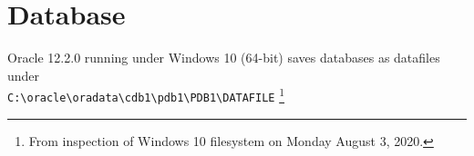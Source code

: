 
\newpage
\setcounter{secnumdepth}{0}
\section{Database}

Oracle 12.2.0 running under Windows 10 (64-bit) saves databases as
datafiles under\\
 \texttt{C:\textbackslash oracle\textbackslash oradata\textbackslash cdb1\textbackslash pdb1\textbackslash PDB1\textbackslash DATAFILE}
\footnote{From inspection of Windows 10 filesystem on Monday August 3, 2020.}

